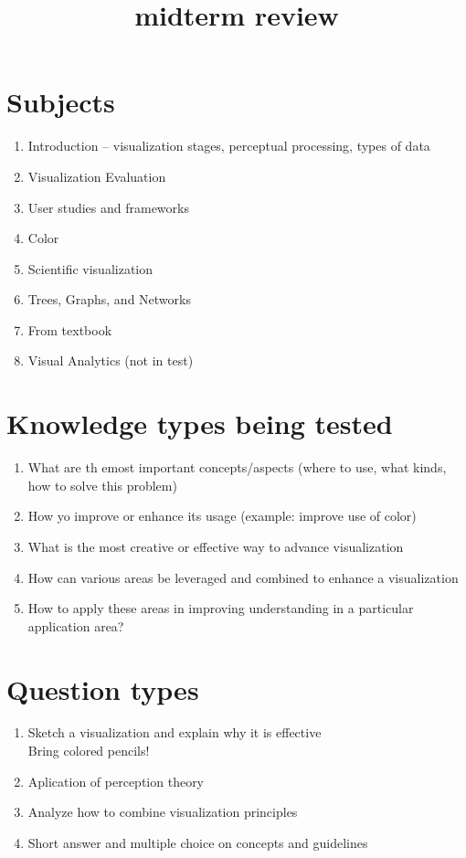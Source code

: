 \documentclass[letterpaper,10pt]{article}
\begin{document}
\title{midterm review}
\date{}
\maketitle

\section{Subjects}
\begin{enumerate}
\item Introduction -- visualization stages, perceptual processing, types of
    data
\item Visualization Evaluation
\item User studies and frameworks
\item Color
\item Scientific visualization
\item Trees, Graphs, and Networks
\item From textbook
\item Visual Analytics (not in test)
\end{enumerate}

\section{Knowledge types being tested}
\begin{enumerate}
\item What are th emost important concepts/aspects
(where to use, what kinds, how to solve this problem)

\item How yo improve or enhance its usage (example: improve use of color)

\item What is the most creative or effective way to advance visualization

\item How can various areas be leveraged and combined to enhance a visualization

\item How to apply these areas in improving understanding in a particular application area?
\end{enumerate}


\section{Question types}
\begin{enumerate}
\item Sketch a visualization and explain why it is effective
    \\ Bring colored pencils!

\item Aplication of perception theory

\item Analyze how to combine visualization principles

\item Short answer and multiple choice on concepts and guidelines
\end{enumerate}
\end{document}
